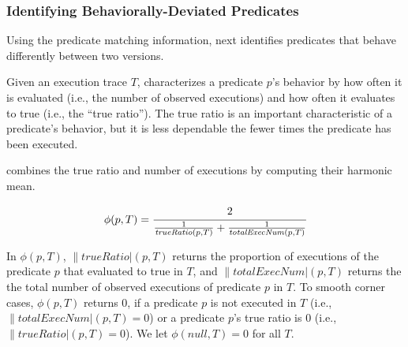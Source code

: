 %

\subsubsection{Identifying Behaviorally-Deviated Predicates}
\label{sec:identify_diff}

Using the predicate matching information, \ourtool next
identifies predicates that behave differently
between two versions. 

Given an execution trace $\mathit{T}$,
\ourtool characterizes a predicate $\mathit{p}$'s behavior by how often
it is evaluated (i.e., the number of observed executions)
and how often it evaluates to true (i.e., the ``true ratio'').
The true ratio is an important characteristic of a predicate's behavior,
but it is less dependable
the fewer times the predicate has been executed.

\ourtool combines the true ratio
and number of executions by computing their harmonic mean.



\vspace{-3mm}

\begin{equation*}
 \|\phi|(p, T)= \cfrac{2}{\frac{1}{\|trueRatio|(p, T)} + \frac{1}{\|totalExecNum|(p, T)}}
\end{equation*}

\vspace{-1mm}

In $\phi(p, T)$, $\|trueRatio|(p, T)$ returns the proportion of executions of the
predicate $p$ that evaluated to true in $T$,
and $\|totalExecNum|(p, T)$ returns the the total
number of observed executions of predicate $p$ in $T$.
To smooth corner cases, $\phi(p, T)$ returns 0, if a predicate $p$ is not executed in $T$ 
(i.e., $\|totalExecNum|(p, T) = 0$) or
a predicate $p$'s true ratio is 0 (i.e., $\|trueRatio|(p, T) = 0$).
We let $\phi(null, T) = 0$ for all $T$.


